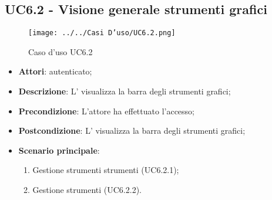 \subsection{UC6.2 - Visione generale strumenti grafici}
\label{ssec:UC6.2}
\begin{figure}[h!]
\centering
\texttt{[image: ../../Casi D'uso/UC6.2.png]}
\caption{Caso d'uso UC6.2}
 \end{figure}
\begin{itemize}
\item \textbf{Attori}:  autenticato;
\item \textbf{Descrizione}: L' visualizza la barra degli strumenti grafici;
\item \textbf{Precondizione}: L'attore ha effettuato l'accesso;
\item \textbf{Postcondizione}: L' visualizza la barra degli strumenti grafici;
\item \textbf{Scenario principale}: \begin{enumerate}\item Gestione strumenti strumenti  (UC6.2.1);\item Gestione strumenti  (UC6.2.2).
 \end{enumerate}
\end{itemize}
\newpage

